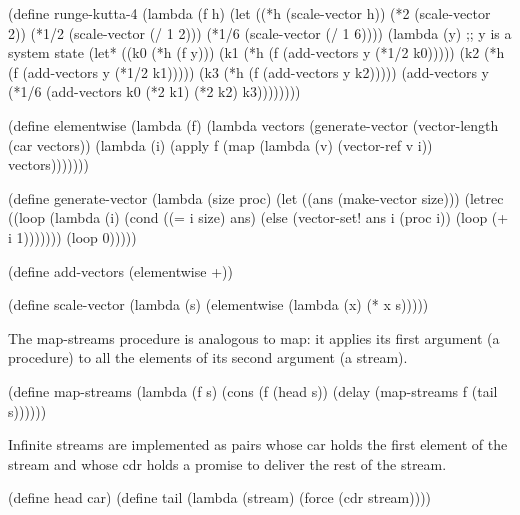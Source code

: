 \begin{schemenoindent}
(define runge-kutta-4
  (lambda (f h)
    (let ((*h (scale-vector h))
          (*2 (scale-vector 2))
          (*1/2 (scale-vector (/ 1 2)))
          (*1/6 (scale-vector (/ 1 6))))
      (lambda (y)
        ;; y {\rm{}is a system state}
        (let* ((k0 (*h (f y)))
               (k1 (*h (f (add-vectors y (*1/2 k0)))))
               (k2 (*h (f (add-vectors y (*1/2 k1)))))
               (k3 (*h (f (add-vectors y k2)))))
          (add-vectors y
            (*1/6 (add-vectors k0
                               (*2 k1)
                               (*2 k2)
                               k3))))))))

(define elementwise
  (lambda (f)
    (lambda vectors
      (generate-vector
        (vector-length (car vectors))
        (lambda (i)
          (apply f
                 (map (lambda (v) (vector-ref  v i))
                      vectors)))))))

(define generate-vector
  (lambda (size proc)
    (let ((ans (make-vector size)))
      (letrec ((loop
                (lambda (i)
                  (cond ((= i size) ans)
                        (else
                         (vector-set! ans i (proc i))
                         (loop (+ i 1)))))))
        (loop 0)))))

(define add-vectors (elementwise +))

(define scale-vector
  (lambda (s)
    (elementwise (lambda (x) (* x s)))))%
\end{schemenoindent}

The {\cf map-streams} procedure is analogous to {\cf map}: it applies its first
argument (a procedure) to all the elements of its second argument (a
stream).

\begin{schemenoindent}
(define map-streams
  (lambda (f s)
    (cons (f (head s))
          (delay (map-streams f (tail s))))))%
\end{schemenoindent}

Infinite streams are implemented as pairs whose car holds the first
element of the stream and whose cdr holds a promise to deliver the rest
of the stream.

\begin{schemenoindent}
(define head car)
(define tail
  (lambda (stream) (force (cdr stream))))%
\end{schemenoindent}

